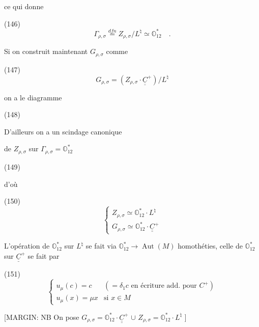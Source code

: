 ce qui donne

(146) $$\Gamma_{\rho,\sigma} \overset{dfn}{=} Z_{\rho,\sigma}/L^\natural \simeq \mathbb{O}_{12}^* \quad .$$

Si on construit maintenant $G_{\rho,\sigma}$
comme

(147) $$G_{\rho,\sigma} = (Z_{\rho,\sigma} \cdot \underline{\underline{C}}^+) / L^\natural$$

on a le diagramme

(148)

D'ailleurs on a un scindage canonique

de $Z_{\rho,\sigma}$ sur $\Gamma_{\rho,\sigma} = \mathbb{O}_{12}^*$

(149)

d'où

(150) $$ \begin{cases} Z_{\rho,\sigma} \simeq \mathbb{O}_{12}^* \cdot L^\natural \\ G_{\rho,\sigma} \simeq \mathbb{O}_{12}^* \cdot \underline{\underline{C}}^+ \end{cases} $$

L'opération de $\mathbb{O}_{12}^*$ sur $L^\natural$ se fait
via $\mathbb{O}_{12}^* \to \operatorname{Aut}(M)$ homothéties, celle
de $\mathbb{O}_{12}^*$ sur $\underline{\underline{C}}^+$ se fait par

(151) $$ \begin{cases} u_\mu(c) = c & (= \delta_1 c \text{ en écriture add. pour } C^+) \\ u_\mu(x) = \mu x & \text{si } x \in M \end{cases} $$

[MARGIN:
NB On pose
$G_{\rho,\sigma} = \mathbb{O}_{12}^* \cdot \underline{\underline{C}}^+$
$\cup$
$Z_{\rho,\sigma} = \mathbb{O}_{12}^* \cdot L^\natural$
]

